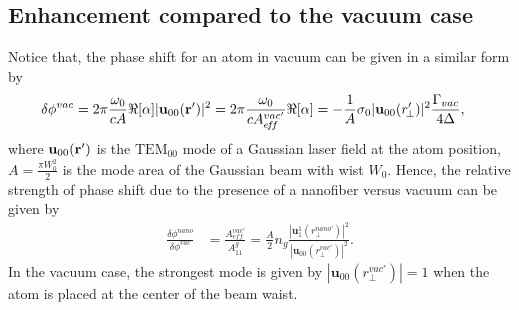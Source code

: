 \documentclass[preprint,aps,pra,onecolumn]{revtex4-1} %
\begin{document}
\subsection{Enhancement compared to the vacuum case}
Notice that, the phase shift for an atom in vacuum can be given in a similar form by
\begin{align}
\delta\phi^{vac} &= 2\pi \frac{\omega_0}{cA} \Re[\alpha] |\mathbf{u}_{00}(\mathbf{r}')|^2 =  2\pi \frac{\omega_0}{c A^{vac'}_{e\!f\!f}} \Re[\alpha]=-\frac{1}{A} \sigma_0 |\mathbf{u}_{00} (r'_{\!\perp})|^2 \frac{\Gamma_{vac}}{4\Delta},
\end{align}
where $\mathbf{u}_{00}(\mathbf{r}')  $ is the $\mathrm{TEM}_{00}$ mode of a Gaussian laser field at the atom position, $ A=\frac{\pi W_0^2}{2} $ is the mode area of the Gaussian beam with wist $ W_0 $. Hence, the relative strength of phase shift due to the presence of a nanofiber versus vacuum can be given by
\begin{align}
\frac{\delta\phi^{nano}}{\delta\phi^{vac}} &=\frac{A_{e\!f\!f}^{vac'}}{A^g_{11}}= \frac{A}{2} \!n_g\! \frac{|\mathbf{u}^1_1(r_\perp^{nano'})|^2}{|\mathbf{u}_{00}(r_\perp^{vac'})|^2}.
\end{align}
In the vacuum case, the strongest mode is given by $ |\mathbf{u}_{00}(r_\perp^{vac'})|=1 $ when the atom is placed at the center of the beam waist. 

\end{document}
